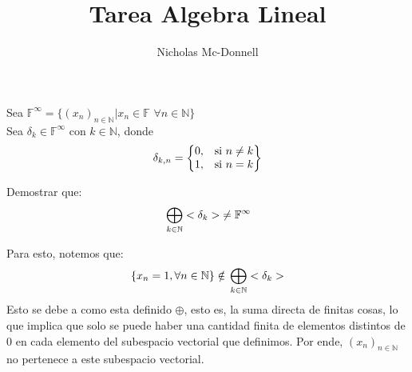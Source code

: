 \documentclass[11pt]{article}
\title{Tarea Algebra Lineal}
\author{Nicholas Mc-Donnell}
\begin{document}
\maketitle

Sea $\mathbb{F}^\infty=\{(x_n)_{n\in\mathbb{N}}|x_n\in\mathbb{F}$ $\forall n\in\mathbb{N}\}$\\
Sea  $\delta_k\in\mathbb{F}^\infty$ con $k\in\mathbb{N}$, donde\\
\[
\delta_{k,n}= \left\{\begin{array}{@{}lr@{}}
        \multirow{1}{*}{0,} & \text{si }n\neq k\\
        1, & \text{si }n=k
        \end{array}\right\}
\]

Demostrar que:
\[
\sideset{}{<\delta_k>}\bigoplus_{k\in\mathbb{N}}\neq\mathbb{F}^\infty
\]

Para esto, notemos que:
\[
\{x_n=1,\forall n\in\mathbb{N}\}\notin\sideset{}{<\delta_k>}\bigoplus_{k\in\mathbb{N}}
\]
Esto se debe a como esta definido $\oplus$, esto es, la suma directa de finitas cosas, lo que implica que solo se puede haber una cantidad finita de elementos distintos de $0$ en cada elemento del subespacio vectorial que definimos. Por ende, $(x_n)_{n\in\mathbb{N}}$ no pertenece a este subespacio vectorial.
\end{document}
